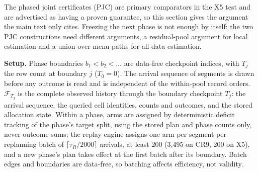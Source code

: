 \documentclass[sigconf,anonymous,review]{acmart}
\begin{document}
The phased joint certificates (PJC) are primary comparators in the X5 test and are advertised as having a proven guarantee, so this section gives the argument the main text only cites. Freezing the next phase is not enough by itself: the two PJC constructions need different arguments, a residual-pool argument for local estimation and a union over menu paths for all-data estimation.

\textbf{Setup.} Phase boundaries $b_1 < b_2 < \dots$ are data-free checkpoint indices, with $T_j$ the row count at boundary $j$ ($T_0 = 0$). The arrival sequence of segments is drawn before any outcome is read and is independent of the within-pool record orders. $\mathcal{F}_{T_j}$ is the complete observed history through the boundary checkpoint $T_j$: the arrival sequence, the queried cell identities, counts and outcomes, and the stored allocation state. Within a phase, arms are assigned by deterministic deficit tracking of the phase's target split, using the stored plan and phase counts only, never outcome sums; the replay engine assigns one arm per segment per replanning batch of $\lceil\tau_R/2000\rceil$ arrivals, at least 200 (3,495 on CR9, 200 on X5), and a new phase's plan takes effect at the first batch after its boundary. Batch edges and boundaries are data-free, so batching affects efficiency, not validity.
\end{document}
